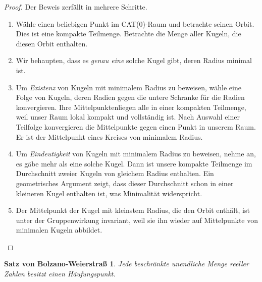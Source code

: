 \documentclass[a4paper,10pt]{article}
\theoremstyle{definition}
\theoremstyle{remark}
\theoremstyle{plain}
\newtheorem*{sbw}{Satz von Bolzano-Weierstra\ss}
\begin{document}
    \begin{proof}
        Der Beweis zerf\"allt in mehrere Schritte.
        \begin{enumerate}
            \item W\"ahle einen beliebigen Punkt im CAT(0)-Raum und betrachte seinen Orbit. Dies
            ist eine kompakte Teilmenge. Betrachte die Menge aller Kugeln, die diesen Orbit
            enthalten.
            \item Wir behaupten, dass es \textit{genau eine} solche Kugel gibt, deren Radius minimal
            ist.
            \item Um \textit{Existenz} von Kugeln mit minimalem Radius zu beweisen, w\"ahle eine Folge
            von Kugeln, deren Radien gegen die untere Schranke f\"ur die Radien konvergieren. Ihre
            Mittelpunktenliegen alle in einer kompakten Teilmenge, weil unser Raum lokal kompakt und
            vollst\"andig ist. Nach Auswahl einer Teilfolge konvergieren die Mittelpunkte gegen einen
            Punkt in unserem Raum. Er ist der Mittelpunkt eines Kreises von minimalem Radius.
            \item Um \textit{Eindeutigkeit} von Kugeln mit minimalem Radius zu beweisen, nehme an, es
            g\"abe mehr als eine solche Kugel. Dann ist unsere kompakte Teilmenge im Durchschnitt zweier
            Kugeln von gleichem Radius enthalten. Ein geometrisches Argument zeigt, dass dieser
            Durchschnitt schon in einer kleineren Kugel enthalten ist, was Minimalit\"at widerspricht.
            \item Der Mittelpunkt der Kugel mit kleinstem Radius, die den Orbit enth\"alt, ist unter der
            Gruppenwirkung invariant, weil sie ihn wieder auf Mittelpunkte von minimalen Kugeln abbildet.
            \qedhere
        \end{enumerate}
    \end{proof}

    \begin{sbw}
        Jede beschr\"ankte unendliche Menge reeller Zahlen besitzt einen H\"aufungspunkt.
    \end{sbw}
\end{document}
